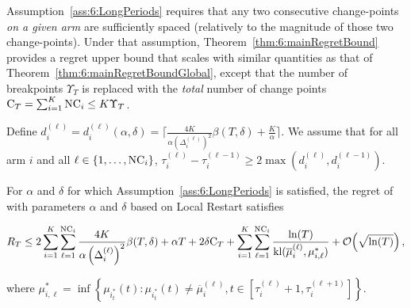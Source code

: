 Assumption~\ref{ass:6:LongPeriods} requires that any two consecutive change-points \emph{on a given arm} are sufficiently spaced (relatively to the magnitude of those two change-points). Under that assumption, Theorem~\ref{thm:6:mainRegretBound} provides a regret upper bound that scales with similar quantities as that of Theorem~\ref{thm:6:mainRegretBoundGlobal}, except that the number of breakpoints $\Upsilon_T$ is replaced with the \emph{total} number of change points $\mathrm{C}_T = \sum_{i=1}^K \text{NC}_i \leq K \Upsilon_T$.

\begin{assumption}\label{ass:6:LongPeriods}
    Define
    $
        d_i^{(\ell)} = d_i^{(\ell)}(\alpha,\delta) = \lceil \frac{4K}{\alpha\left(\Delta_i^{(\ell)}\right)^2}\beta(T,\delta) + \frac{K}{\alpha}\rceil.
    $
    We assume that for all arm $i$ and all $\ell \in \{1,\dots,\text{NC}_i\}$, $\tau_i^{(\ell)} - \tau_i^{(\ell-1)} \geq 2\max (d_i^{(\ell)},d_i^{(\ell-1)})$.
\end{assumption}

\begin{theorem}
    \label{thm:6:mainRegretBound}For $\alpha$ and $\delta$ for which Assumption~\ref{ass:6:LongPeriods} is satisfied, the regret of \GLRklUCB{} with parameters $\alpha$ and $\delta$ based on Local Restart satisfies
    \begin{small}
    \[R_T \leq 2\sum_{i=1}^K\sum_{\ell=1}^{\text{NC}_i} \frac{4K}{\alpha \left(\Delta_i^{(\ell)}\right)^2}\beta(T,\delta) +\alpha T + 2 \delta \mathrm{C}_T  + \sum_{i=1}^K\sum_{\ell=1}^{\text{NC}_i} \frac{\ln(T)}{\mathrm{kl}(\overline{\mu}_i^{(\ell)},{\mu}^*_{i,\ell})} +\mathop{}\mathopen{}\mathcal{O}\mathopen{}\left(\sqrt{\ln(T)}\right),\]
    \end{small}
    where
    ${\mu}^*_{i,\ell} = \inf \left\{ \mu_{i_t^*}(t) : \mu_{i_t^*}(t) \neq \overline{\mu}_i^{(\ell)}, t \in [\tau_i^{(\ell)}+1, \tau_i^{(\ell+1)}]\right\}$.
\end{theorem}


